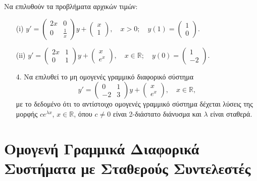 \documentclass[11pt,a4paper,twoside]{book}
\begin{document}
\begin{askhseis}
\item Να επιλυθούν τα προβλήματα αρχικών τιμών:
\begin{enumerate}
    \item[(i)] $y' = \begin{pmatrix} 2x & 0 \\ 0 & \frac{1}{x} \end{pmatrix} y + \begin{pmatrix} x \\ 1 \end{pmatrix}, \quad x>0; \quad y(1) = \begin{pmatrix} 1 \\ 0 \end{pmatrix}.$
    \item[(ii)] $y' = \begin{pmatrix} 2x & 1 \\ 0 & 1 \end{pmatrix} y + \begin{pmatrix} x \\ e^x \end{pmatrix}, \quad x \in \mathbb{R}; \quad y(0) = \begin{pmatrix} 1 \\ -2 \end{pmatrix}.$
\end{enumerate}
\begin{enumerate}
    \item[4.] Να επιλυθεί το μη ομογενές γραμμικό διαφορικό σύστημα
    \[
    y' = \begin{pmatrix} 0 & 1 \\ -2 & 3 \end{pmatrix} y + \begin{pmatrix} x \\ e^x \end{pmatrix}, \quad x \in \mathbb{R},
    \]
    με το δεδομένο ότι το αντίστοιχο ομογενές γραμμικό σύστημα δέχεται λύσεις της μορφής $ce^{\lambda x}$, $x \in \mathbb{R}$, όπου $c \neq 0$ είναι 2-διάστατο διάνυσμα και $\lambda$ είναι σταθερά.
\end{enumerate}
\end{askhseis}
\section{Ομογενή Γραμμικά Διαφορικά Συστήματα με Σταθερούς Συντελεστές}
\end{document}
